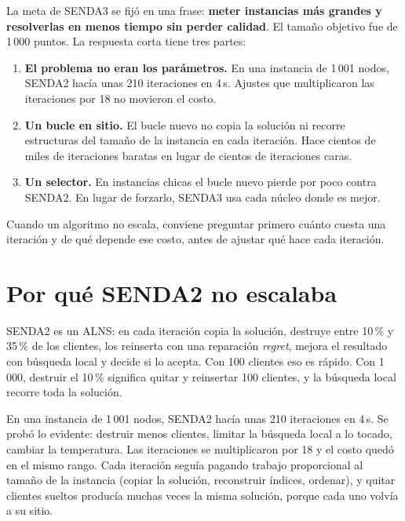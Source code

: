 \documentclass[11pt,a4paper]{article}
\newcommand{\sendados}{SENDA2}
\newcommand{\sendatres}{SENDA3}
\begin{document}
La meta de \sendatres{} se fijó en una frase: \textbf{meter instancias más grandes y resolverlas en
menos tiempo sin perder calidad}. El tamaño objetivo fue de 1\,000 puntos. La respuesta corta tiene
tres partes:

\begin{enumerate}[leftmargin=1.5em]
\item \textbf{El problema no eran los parámetros.} En una instancia de 1\,001 nodos, \sendados{} hacía
unas 210 iteraciones en 4\,s. Ajustes que multiplicaron las iteraciones por 18 no movieron el costo.
\item \textbf{Un bucle en sitio.} El bucle nuevo no copia la solución ni recorre estructuras del
tamaño de la instancia en cada iteración. Hace cientos de miles de iteraciones baratas en lugar de
cientos de iteraciones caras.
\item \textbf{Un selector.} En instancias chicas el bucle nuevo pierde por poco contra \sendados. En
lugar de forzarlo, \sendatres{} usa cada núcleo donde es mejor.
\end{enumerate}

\begin{ideaclave}
Cuando un algoritmo no escala, conviene preguntar primero cuánto cuesta una iteración y de qué
depende ese costo, antes de ajustar qué hace cada iteración.
\end{ideaclave}

\section{Por qué \sendados{} no escalaba}
\label{sec:porque}

\sendados{} es un ALNS: en cada iteración copia la solución, destruye entre 10\,\% y 35\,\% de los
clientes, los reinserta con una reparación \emph{regret}, mejora el resultado con búsqueda local y
decide si lo acepta. Con 100 clientes eso es rápido. Con 1\,000, destruir el 10\,\% significa quitar y
reinsertar 100 clientes, y la búsqueda local recorre toda la solución.

En una instancia de 1\,001 nodos, \sendados{} hacía unas 210 iteraciones en 4\,s. Se probó lo evidente:
destruir menos clientes, limitar la búsqueda local a lo tocado, cambiar la temperatura. Las iteraciones
se multiplicaron por 18 y el costo quedó en el mismo rango. Cada iteración seguía pagando trabajo
proporcional al tamaño de la instancia (copiar la solución, reconstruir índices, ordenar), y quitar
clientes sueltos producía muchas veces la misma solución, porque cada uno volvía a su sitio.
\end{document}
